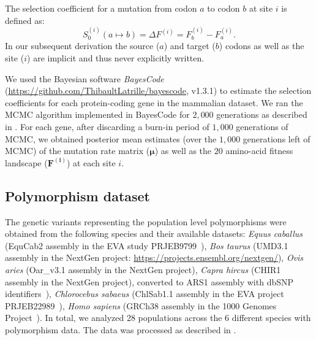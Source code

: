 \documentclass[9pt,twocolumn,twoside,lineno]{pnas-new}
\newcommand{\UniDimArray}[1]{\bm{#1}}
\newcommand{\Sphy}{S_{0}}
\begin{document}
{       The selection coefficient for a mutation from codon $a$ to codon $b$ at site $i$ is defined as:
       \begin{equation}
              \Sphy^{(i)} (a \mapsto b) = \Delta F^{(i)} = F^{(i)}_{b} - F^{(i)}_{a}.
       \end{equation}
       In our subsequent derivation the source ($a$) and target ($b$) codons as well as the site ($i$) are implicit and thus never explicitly written.

       We used the Bayesian software \textit{BayesCode} (\url{https://github.com/ThibaultLatrille/bayescode}, v1.3.1) to estimate the selection coefficients for each protein-coding gene in the mammalian dataset.
       We ran the MCMC algorithm implemented in BayesCode for $2,000$ generations as described in \cite[Latrille et al]{latrille_genes_2023}.
       For each gene, after discarding a burn-in period of $1,000$ generations of MCMC, we obtained posterior mean estimates (over the $1,000$ generations left of MCMC) of the mutation rate matrix ($\UniDimArray{\mu}$) as well as the $20$ amino-acid fitness landscape ($\UniDimArray{F^{(i)}}$) at each site $i$.

       \subsection{Polymorphism dataset}
       \label{subsec:polymorphism-dataset}

       The genetic variants representing the population level polymorphisms were obtained from the following species and their available datasets: \textit{Equus caballus} (EquCab2 assembly in the EVA study PRJEB9799~\cite{alabri_whole_2020}), \textit{Bos taurus} (UMD3.1 assembly in the NextGen project: \url{https://projects.ensembl.org/nextgen/}), \textit{Ovis aries} (Oar\_v3.1 assembly in the NextGen project), \textit{Capra hircus} (CHIR1 assembly in the NextGen project), converted to ARS1 assembly with dbSNP identifiers~\cite{sherry_dbsnp_2001}), \textit{Chlorocebus sabaeus} (ChlSab1.1 assembly in the EVA project PRJEB22989~\cite{svardal_ancient_2017}), \textit{Homo sapiens} (GRCh38 assembly in the 1000 Genomes Project~\cite{zheng-bradley_alignment_2017}).
       In total, we analyzed 28 populations across the 6 different species with polymorphism data.
       The data was processed as described in \cite[Latrille et al]{latrille_genes_2023}.

}
\end{document}
